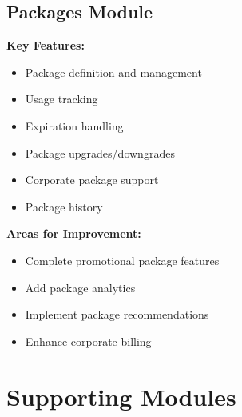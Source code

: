 \subsection{Packages Module}
\begin{tcolorbox}[
    enhanced,
    title={Packages Module: 65\% Complete},
    attach boxed title to top left,
    boxed title style={
        colback=warning!50,
        colframe=warning!50,
        arc=0mm,
    },
    colback=white,
    colframe=warning!50,
    arc=0mm,
    fonttitle=\bfseries
]
    \textbf{Key Features:}
    \begin{itemize}
        \item Package definition and management
        \item Usage tracking
        \item Expiration handling
        \item Package upgrades/downgrades
        \item Corporate package support
        \item Package history
    \end{itemize}
    
    \textbf{Areas for Improvement:}
    \begin{itemize}
        \item Complete promotional package features
        \item Add package analytics
        \item Implement package recommendations
        \item Enhance corporate billing
    \end{itemize}
\end{tcolorbox}

\clearpage
\section{Supporting Modules}

